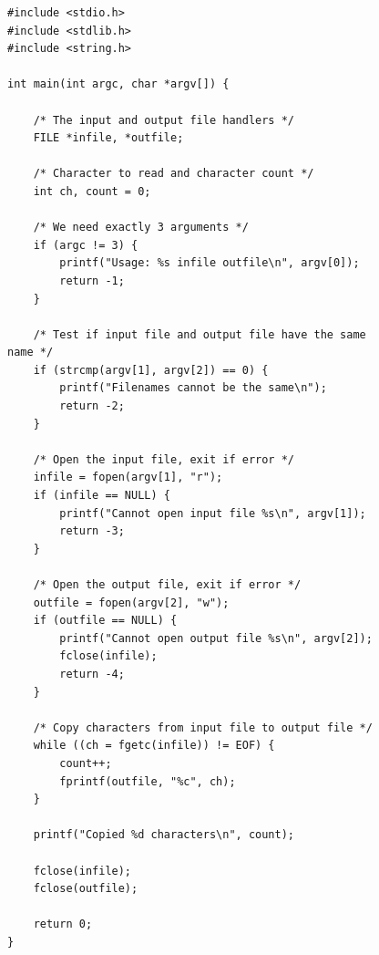 \documentclass[a4paper,10pt,fleqn,twoside]{article}
\begin{document}
\begin{figure}[!p]
\begin{lstlisting}[caption=Programma om een bestand te kopi\"eren.,label=cod:filecopy]
#include <stdio.h>
#include <stdlib.h>
#include <string.h>
	
int main(int argc, char *argv[]) {
	
	/* The input and output file handlers */
	FILE *infile, *outfile;
	
	/* Character to read and character count */
	int ch, count = 0;
	
	/* We need exactly 3 arguments */
	if (argc != 3) {
		printf("Usage: %s infile outfile\n", argv[0]);
		return -1;
	}
	
	/* Test if input file and output file have the same name */
	if (strcmp(argv[1], argv[2]) == 0) {
		printf("Filenames cannot be the same\n");
		return -2;
	}
	
	/* Open the input file, exit if error */
	infile = fopen(argv[1], "r");
	if (infile == NULL) {
		printf("Cannot open input file %s\n", argv[1]);
		return -3;
	}
	
	/* Open the output file, exit if error */
	outfile = fopen(argv[2], "w");
	if (outfile == NULL) {
		printf("Cannot open output file %s\n", argv[2]);
		fclose(infile);
		return -4;
	}
	
	/* Copy characters from input file to output file */
	while ((ch = fgetc(infile)) != EOF) {
		count++;
		fprintf(outfile, "%c", ch);
	}
	
	printf("Copied %d characters\n", count);
	
	fclose(infile);
	fclose(outfile);
	
	return 0;
}
\end{lstlisting}
\end{figure}
\end{document}
